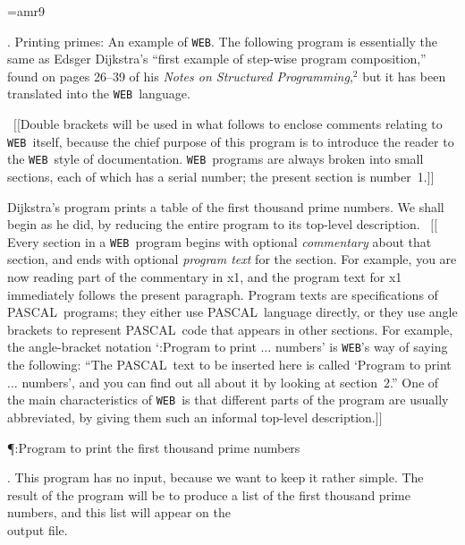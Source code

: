 
\font\ninerm=amr9
\let\mc=\ninerm %
\def\WEB{{\tt WEB}}
\def\PASCAL{{\mc PASCAL}}
\def\[{\ifhmode\ \fi$[\![$}
\def\]{$]\!]$\ }
\def\<{$\langle\,$}
\def\>{$\,\rangle$}
\def\Dijk{{2}} %
\def\goto{{3}} %
\def\sec{{\tensy x}}
\hsize=84mm


.  Printing primes: An example of \WEB.
The following program is essentially the same as Edsger Dijkstra's
``first example of step-wise program composition,''
found on pages 26--39 of his {\sl Notes on Structured Programming},$^{\Dijk}$
but it has been translated into the \WEB\ language.

\[Double brackets will be used in what follows to enclose comments
relating to \WEB\ itself, because the chief purpose of this program
is to introduce the reader to the \WEB\ style of documentation.
\WEB\ programs are always broken into small sections, each
of which has a serial number; the present section is number~1.\]

Dijkstra's program prints a table of the first thousand prime numbers.  We
shall begin as he did, by reducing the entire program to its top-level
description. \[Every section in a \WEB\ program begins with optional {\it
commentary\/} about that section, and ends with optional {\it program
text\/} for the section. For example, you are now reading part of the
commentary in \sec1, and the program text for \sec1 immediately follows
the present paragraph. Program texts are specifications of \PASCAL\
programs; they either use \PASCAL\ language directly, or they use angle
brackets to represent \PASCAL\ code that appears in other sections. For
example, the angle-bracket notation `\X2:Program to print $\ldots$
numbers\X' is \WEB's way of saying the following: ``The \PASCAL\ text to
be inserted here is called `Program to print $\ldots$ numbers', and you
can find out all about it by looking at section~2.'' One of the main
characteristics of \WEB\ is that different parts of the program are
usually abbreviated, by giving them such an informal top-level
description.\]

\Y\P{}:Program to print the first thousand prime numbers\X\par
\fi

. This program has no input, because we want to keep it rather simple.
The result of the program will be to produce a list of the first
thousand prime numbers, and this list will appear on the \\{output} file.

